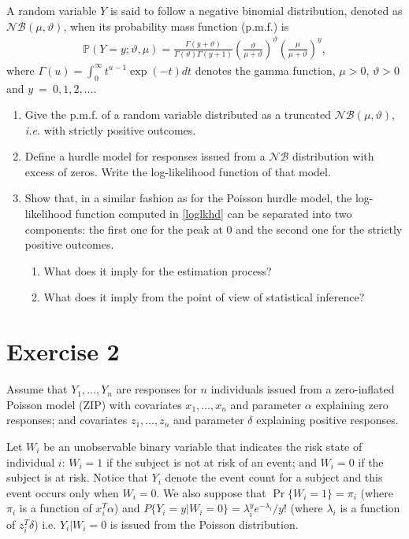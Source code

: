 \documentclass[a4paper,12pt]{article}
\def\Proba{\mathbb{P}}
\begin{document}
A random variable $Y$ is said to follow a negative binomial distribution, denoted as $\mathcal{NB}(\mu,\vartheta)$, when its probability mass function (p.m.f.) is
\begin{eqnarray*}
\Proba(Y = y ; \vartheta, \mu) = \frac {\Gamma(y+\vartheta)}{\Gamma(\vartheta)\Gamma(y+1)}\left(\frac{\vartheta}{\mu+\vartheta}\right)^\vartheta
\left(\frac{\mu}{\mu+\vartheta}\right)^{y},
\end{eqnarray*}
where $\Gamma(u)=\int_0^\infty t^{u-1}\exp(-t)dt$ denotes the gamma function, $\mu>0$, $\vartheta>0$ and $y~=~0,1,2,\ldots$.
\begin{enumerate}[ref=\bf{\alph*)}]
\item{Give the p.m.f. of a random variable distributed as a truncated $\mathcal{NB}(\mu,\vartheta)$, \textit{i.e.} with strictly positive outcomes.}
\item\label{loglkhd}{Define a hurdle model for responses issued from a $\mathcal{NB}$ distribution with excess of zeros. Write the log-likelihood function of that model.}
\item{Show that, in a similar fashion as for the Poisson hurdle model, the log-likelihood function computed in \ref{loglkhd} can be separated into two components: the first one for the peak at 0 and the second one for the strictly positive outcomes.
\begin{enumerate}
\item{What does it imply for the estimation process?}
\item{What does it imply from the point of view of statistical inference?}
\end{enumerate}}
\end{enumerate}


\section{Exercise 2}

Assume that $Y_1, \ldots, Y_n$ are responses for $n$ individuals issued from 
a
zero-inflated Poisson model (ZIP) with covariates $x_1, \ldots, x_n$ and
parameter $\alpha$ explaining zero responses; and covariates $z_1, \ldots,
z_n$ and parameter $\delta$ explaining positive responses.


Let $W_i$ be an unobservable binary variable that indicates the risk state of 
individual
$i$: $W_i=1$ if the subject is not at risk of an event; and $W_i=0$
if the subject is at risk. Notice that $Y_i$ denote the event count for a
subject and this event occurs only when $W_i=0$. We also suppose  that
$\Pr\{W_i=1\}=\pi_i$ (where $\pi_i$ is a function of $x_i^T\alpha$) and
$P\{Y_i=y|W_i=0\}=\lambda_i^y e^{-\lambda_i}/y!$ (where $\lambda_i$ is a
function of $z_i^T\delta$) i.e.  $Y_i|W_i=0$ is issued from the Poisson
distribution.
\end{document}
